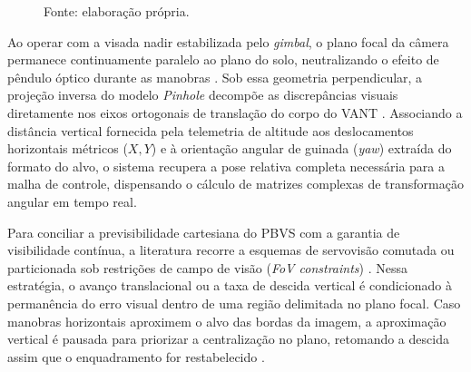 \begin{figure}[H]

    \vspace{0.2cm}

    \begin{flushleft}
        \footnotesize Fonte: elaboração própria.
    \end{flushleft}

\end{figure}

Ao operar com a visada nadir estabilizada pelo \textit{gimbal}, o plano focal da câmera permanece continuamente paralelo ao plano do solo, neutralizando o efeito de pêndulo óptico durante as manobras \cite{keipour2022}. Sob essa geometria perpendicular, a projeção inversa do modelo \textit{Pinhole} decompõe as discrepâncias visuais diretamente nos eixos ortogonais de translação do corpo do VANT \cite{fagundes2025}. Associando a distância vertical fornecida pela telemetria de altitude aos deslocamentos horizontais métricos ($X, Y$) e à orientação angular de guinada (\textit{yaw}) extraída do formato do alvo, o sistema recupera a pose relativa completa necessária para a malha de controle, dispensando o cálculo de matrizes complexas de transformação angular em tempo real.

Para conciliar a previsibilidade cartesiana do PBVS com a garantia de visibilidade contínua, a literatura recorre a esquemas de servovisão comutada ou particionada sob restrições de campo de visão (\textit{FoV constraints}) \cite{hafez2013, pramono2025}. Nessa estratégia, o avanço translacional ou a taxa de descida vertical é condicionado à permanência do erro visual dentro de uma região delimitada no plano focal. Caso manobras horizontais aproximem o alvo das bordas da imagem, a aproximação vertical é pausada para priorizar a centralização no plano, retomando a descida assim que o enquadramento for restabelecido \cite{hafez2013}.

